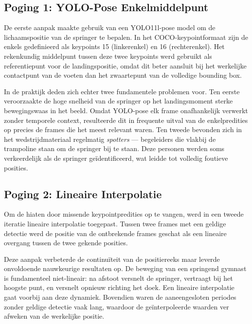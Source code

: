 \subsection{Poging 1: YOLO-Pose Enkelmiddelpunt}
\label{subsec:landingspositie-yolo}

De eerste aanpak maakte gebruik van een YOLO11l-pose model \autocite{Jocher_Ultralytics_YOLO_2023} om de lichaamspositie van de springer te bepalen. In het COCO-keypointformaat zijn de enkels gedefinieerd als keypoints 15 (linkerenkel) en 16 (rechterenkel). Het rekenkundig middelpunt tussen deze twee keypoints werd gebruikt als referentiepunt voor de landingspositie, omdat dit beter aansluit bij het werkelijke contactpunt van de voeten dan het zwaartepunt van de volledige bounding box.

In de praktijk deden zich echter twee fundamentele problemen voor. Ten eerste veroorzaakte de hoge snelheid van de springer op het landingsmoment sterke bewegingswaas in het beeld. Omdat YOLO-pose elk frame onafhankelijk verwerkt zonder temporele context, resulteerde dit in frequente uitval van de enkelpredities op precies de frames die het meest relevant waren. Ten tweede bevonden zich in het wedstrijdmateriaal regelmatig \textit{spotters} --- begeleiders die vlakbij de trampoline staan om de springer bij te staan. Deze personen werden soms verkeerdelijk als de springer ge{\"i}dentificeerd, wat leidde tot volledig foutieve posities.

\subsection{Poging 2: Lineaire Interpolatie}
\label{subsec:landingspositie-interpolatie}

Om de hiaten door missende keypointpredities op te vangen, werd in een tweede iteratie lineaire interpolatie toegepast. Tussen twee frames met een geldige detectie werd de positie van de ontbrekende frames geschat als een lineaire overgang tussen de twee gekende posities.

Deze aanpak verbeterde de continuïteit van de positiereeks maar leverde onvoldoende nauwkeurige resultaten op. De beweging van een springend gymnast is fundamenteel niet-lineair: na afstoot versnelt de springer, vertraagt bij het hoogste punt, en versnelt opnieuw richting het doek. Een lineaire interpolatie gaat voorbij aan deze dynamiek. Bovendien waren de aaneengesloten periodes zonder geldige detectie vaak lang, waardoor de ge{\"i}nterpoleerde waarden ver afweken van de werkelijke positie.

